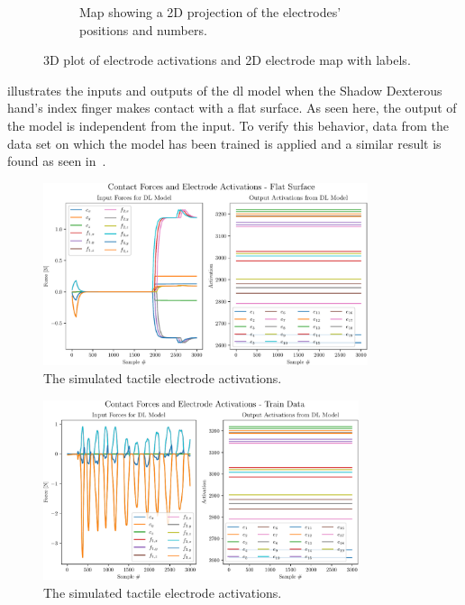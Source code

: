 \begin{figure}[h]
\begin{subfigure}[b]{0.48\textwidth}
		\caption{Map showing a 2D projection of the electrodes' positions and numbers.}
		\label{fig:electrode-map}
	\end{subfigure}
		\caption{3D plot of electrode activations and 2D electrode map with labels.}
		\label{fig:flat-contact-experimental-and-electrode-map}
\end{figure}

 illustrates the inputs and outputs of the \gls{dl} model when the Shadow Dexterous hand's index finger makes contact with a flat surface. As seen here, the output of the model is independent from the input. To verify this behavior, data from the data set on which the model has been trained is applied and a similar result is found as seen in~.

\begin{figure}[h]
	\begin{center}
		\includegraphics[width=0.85\textwidth]{chapters/1-tactile-perception/fig/flat-contact-graph-crop.pdf}
	\end{center}
	\caption{The simulated tactile electrode activations.}
	\label{fig:flat-contact-graph}
\end{figure}

\begin{figure}[h]
	\begin{center}
		\includegraphics[width=0.825\textwidth]{chapters/1-tactile-perception/fig/train-contact-graph.pdf}
	\end{center}
	\caption{The simulated tactile electrode activations.}
	\label{fig:train-contact-graph}
\end{figure}


